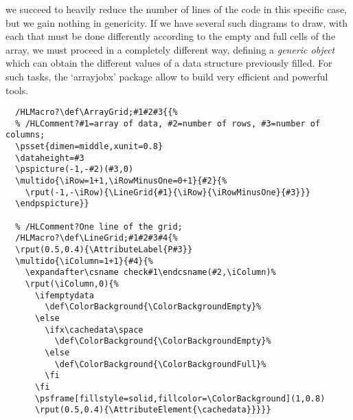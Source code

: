 \documentclass{article}
\newcommand{\ArrayJobPackage}{`\textsf{arrayjobx}'}
\begin{document}
\vspace{2mm}
\noindent we succeed to heavily reduce the number of lines of the code in this
specific case, but we gain nothing in genericity. If we have several such
diagrams to draw, with each that must be done differently according to the
empty and full cells of the array, we must proceed in a completely different
way, defining a \emph{generic object} which can obtain the different values of
a data structure previously filled. For such tasks, the \ArrayJobPackage{}
package allow to build very efficient and powerful tools.

\begin{Verbatim}[commandchars=/?;]
  % /HLComment?The grid;
  /HLMacro?\def\ArrayGrid;#1#2#3{{%
  % /HLComment?#1=array of data, #2=number of rows, #3=number of columns;
  \psset{dimen=middle,xunit=0.8}
  \dataheight=#3
  \pspicture(-1,-#2)(#3,0)
  \multido{\iRow=1+1,\iRowMinusOne=0+1}{#2}{%
    \rput(-1,-\iRow){\LineGrid{#1}{\iRow}{\iRowMinusOne}{#3}}}
  \endpspicture}}

  % /HLComment?One line of the grid;
  /HLMacro?\def\LineGrid;#1#2#3#4{%
  \rput(0.5,0.4){\AttributeLabel{P#3}}
  \multido{\iColumn=1+1}{#4}{%
    \expandafter\csname check#1\endcsname(#2,\iColumn)%
    \rput(\iColumn,0){%
      \ifemptydata
        \def\ColorBackground{\ColorBackgroundEmpty}%
      \else
        \ifx\cachedata\space
          \def\ColorBackground{\ColorBackgroundEmpty}%
        \else
          \def\ColorBackground{\ColorBackgroundFull}%
        \fi
      \fi
      \psframe[fillstyle=solid,fillcolor=\ColorBackground](1,0.8)
      \rput(0.5,0.4){\AttributeElement{\cachedata}}}}}
\end{Verbatim}

\def\ArrayGrid#1#2#3{{%
\psset{dimen=middle,xunit=0.8}
\dataheight=#3
\pspicture(-1,-#2)(#3,0)
\multido{\iRow=1+1,\iRowMinusOne=0+1}{#2}{%
  \rput(-1,-\iRow){\LineGrid{#1}{\iRow}{\iRowMinusOne}{#3}}}
\endpspicture}}

\def\LineGrid#1#2#3#4{%
\rput(0.3,0.4){\AttributeLabel{P#3}}
\multido{\iColumn=1+1}{#4}{%
  \expandafter\csname check#1\endcsname(#2,\iColumn)%
  \rput(\iColumn,0){%
    \ifemptydata
      \def\ColorBackground{\ColorBackgroundEmpty}%
    \else
      \ifx\cachedata\space
        \def\ColorBackground{\ColorBackgroundEmpty}%
      \else
        \def\ColorBackground{\ColorBackgroundFull}%
      \fi
    \fi
    \psframe[fillstyle=solid,fillcolor=\ColorBackground](1,0.8)
    \rput(0.5,0.4){\AttributeElement{\cachedata}}}}}
\end{document}
